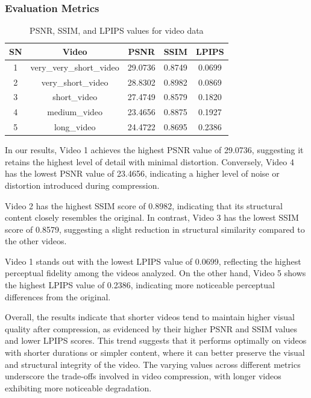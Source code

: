 \documentclass{ioereport}
\begin{document}
\subsubsection{Evaluation Metrics}
\begin{table}[H]
    \caption{PSNR, SSIM, and LPIPS values for video data}
    \centering
    \begin{tabular}{|c|c|c|c|c|}
        \hline
        \textbf{SN} & \textbf{Video} & \textbf{PSNR} & \textbf{SSIM} & \textbf{LPIPS} \\
        \hline
        1 & very\_very\_short\_video & 29.0736 & 0.8749 & 0.0699 \\ 
        \hline
        2 & very\_short\_video & 28.8302 & 0.8982 & 0.0869 \\ 
        \hline
        3 & short\_video & 27.4749 & 0.8579 & 0.1820 \\ 
        \hline
        4 & medium\_video & 23.4656 & 0.8875 & 0.1927 \\ 
        \hline
        5 & long\_video & 24.4722 & 0.8695 & 0.2386 \\ 
        \bottomrule
    \end{tabular}
    \label{tab:video_metrics}
\end{table}
In our results, Video 1 achieves the highest PSNR value of 29.0736, suggesting it retains the highest level of detail with minimal distortion. Conversely, Video 4 has the lowest PSNR value of 23.4656, indicating a higher level of noise or distortion introduced during compression.

Video 2 has the highest SSIM score of 0.8982, indicating that its structural content closely resembles the original. In contrast, Video 3 has the lowest SSIM score of 0.8579, suggesting a slight reduction in structural similarity compared to the other videos.

 Video 1 stands out with the lowest LPIPS value of 0.0699, reflecting the highest perceptual fidelity among the videos analyzed. On the other hand, Video 5 shows the highest LPIPS value of 0.2386, indicating more noticeable perceptual differences from the original.

Overall, the results indicate that shorter videos tend to maintain higher visual quality after compression, as evidenced by their higher PSNR and SSIM values and lower LPIPS scores. This trend suggests that it performs optimally on videos with shorter durations or simpler content, where it can better preserve the visual and structural integrity of the video. The varying values across different metrics underscore the trade-offs involved in video compression, with longer videos exhibiting more noticeable degradation.
\end{document}
